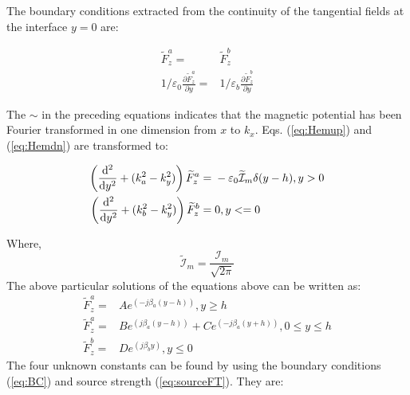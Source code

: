 \documentclass{article}
\begin{document}
  The boundary conditions extracted from the continuity of the tangential fields at the interface $y = 0$ are:

  \begin{subequations}
    \begin{align}
      \widetilde{F}_z^a ={}& \widetilde{F}_z^b
      \label{eq:HBC} \\
      1 /\varepsilon_0 \frac{\partial \widetilde{F}_z^a}{\partial y} ={}& 1 /\varepsilon_b\frac{\partial \widetilde{F}_z^b}{\partial y}
      \label{eq:EBC}
    \end{align}
    \label{eq:BC}
  \end{subequations}

  The $\sim$ in the preceding equations indicates that the magnetic potential has been Fourier transformed in one dimension from $x$ to $k_x$. Eqs. (\ref{eq:Hemup}) and (\ref{eq:Hemdn}) are transformed to:

  \begin{subequations}
    \begin{align}
      \left( \dv[2]{}{y} + (k_a^2 - k_y^2) \right) \widetilde{F}_z^a ={}& -\varepsilon_0 \mathcal{\widetilde{I}}_m \delta(y - h), y > 0
      \label{eq:FTHemup} \\
      \left( \dv[2]{}{y} + (k_b^2 - k_y^2) \right) \widetilde{F}_z^b ={}& 0,     y <= 0 \label{eq:Hemdn}
    \end{align}
  \end{subequations}

  Where,
  \begin{equation}
    \mathcal{\widetilde{I}}_m = \frac{\mathcal{I}_m}{\sqrt{2\pi}}
    \label{eq:sourceFT}
  \end{equation}
  The above particular solutions of the equations above can be written as:
  \begin{subequations}
    \begin{align}
      \widetilde{F}_z^a ={}& A e^{\left(-j\beta_a(y - h) \right)}, y \geq h \\
      \widetilde{F}_z^a ={}& B e^{\left(j\beta_a(y - h) \right)} + C e^{\left(-j\beta_a(y + h) \right)}, 0 \leq y \leq h \\
      \widetilde{F}_z^b ={}& D e^{\left(j\beta_b y \right)} , y \leq 0
    \end{align}
  \end{subequations}
  The four unknown constants can be found by using the boundary conditions (\ref{eq:BC}) and source strength (\ref{eq:sourceFT}). They are:
\end{document}
